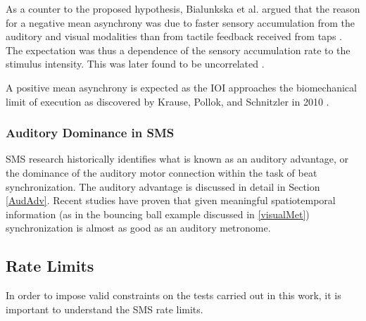 As a counter to the proposed hypothesis, Bialunkska et al. argued that the reason for a negative mean asynchrony was due to faster sensory accumulation from the auditory and visual modalities than from tactile feedback received from taps \cite{bialunska2011increasing}. The expectation was thus a dependence of the sensory accumulation rate to the stimulus intensity. This was later found to be uncorrelated \cite{bialunska2011increasing}.

A positive mean asynchrony is expected as the IOI approaches the biomechanical limit of execution as discovered by Krause, Pollok, and Schnitzler in 2010 \cite{krause2010perception}.

\subsubsection{Auditory Dominance in SMS}
SMS research historically identifies what is known as an auditory advantage, or the dominance of the auditory motor connection within the task of beat synchronization. The auditory advantage is discussed in detail in Section \ref{AudAdv}. Recent studies have proven that given meaningful spatiotemporal information (as in the bouncing ball example discussed in \ref{visualMet}) synchronization is almost as good as an auditory metronome.

\subsection{Rate Limits} \label{rateLimits}
In order to impose valid constraints on the tests carried out in this work, it is important to understand the SMS rate limits. 


